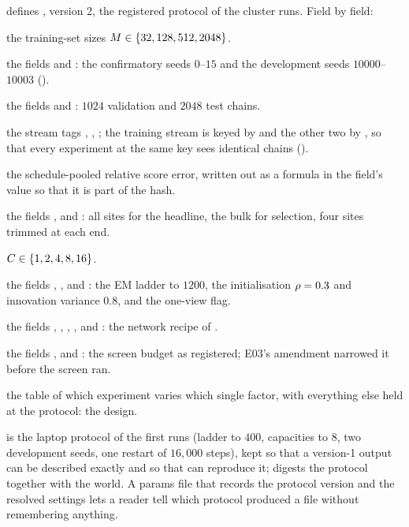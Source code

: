  defines , version 2, the registered
protocol of the cluster runs. Field by field:
\begin{description}[leftmargin=2em,itemsep=0.2em]
\item[\code{sizes}] the training-set sizes $M\in\{32,128,512,2048\}$.
\item[seeds] the fields  and : the confirmatory seeds $0$--$15$ and the
  development seeds $10000$--$10003$ ().
\item[bundle sizes] the fields  and : $1024$ validation and $2048$ test chains.
\item[\code{bundle\_tags}] the stream tags , ,
  ; the training stream is keyed by  and the other
  two by , so that every experiment at the same key sees identical
  chains ().
\item[\code{estimand}] the schedule-pooled relative score error, written out as a
  formula in the field's value so that it is part of the hash.
\item[regions] the fields ,  and
  : all sites for the headline, the bulk for selection, four sites
  trimmed at each end.
\item[\code{capacities}] $C\in\{1,2,4,8,16\}$.
\item[EM arm] the fields , ,
   and : the EM ladder to $1200$, the initialisation
  $\rho=0.3$ and innovation variance $0.8$, and the one-view flag.
\item[network arms] the fields , ,
  , ,  and : the
  network recipe of .
\item[screen] the fields ,  and
  : the screen budget as registered; E03's amendment narrowed it
  before the screen ran.
\item[\code{factors}] the table of which experiment varies which single factor, with
  everything else held at the protocol: the  design.
\end{description}
 is the laptop protocol of the first runs (ladder to $400$, capacities to $8$,
two development seeds, one restart of $16{,}000$ steps), kept so that a version-1 output
can be described exactly and so that  can reproduce it;
 digests the protocol together with the world. A params file that
records the protocol version and the resolved settings lets a reader tell which protocol
produced a file without remembering anything.

